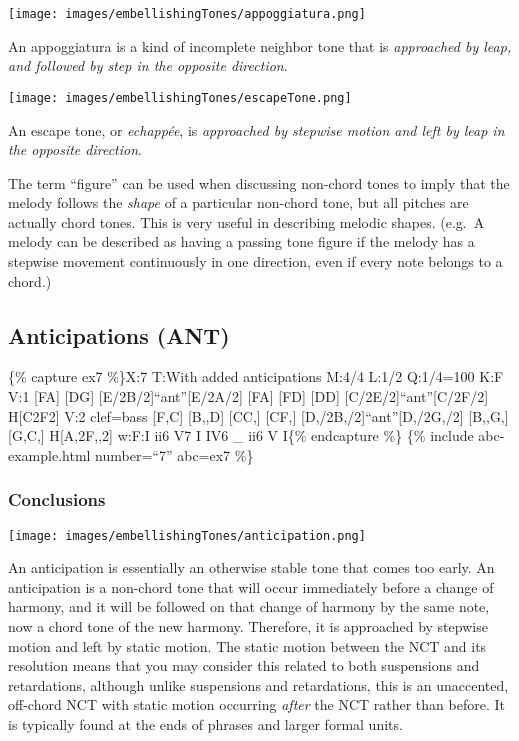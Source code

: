 \documentclass{book}
\begin{document}
\texttt{[image: images/embellishingTones/appoggiatura.png]}

An appoggiatura is a kind of incomplete neighbor tone that is \emph{approached
by leap, and followed by step in the opposite direction}.

\texttt{[image: images/embellishingTones/escapeTone.png]}

An escape tone, or \emph{echappée}, is \emph{approached by stepwise motion and
left by leap in the opposite direction}.

The term ``figure'' can be used when discussing non-chord tones to imply that
the melody follows the \emph{shape} of a particular non-chord tone, but all
pitches are actually chord tones. This is very useful in describing melodic
shapes. (e.g.~A melody can be described as having a passing tone figure if the
melody has a stepwise movement continuously in one direction, even if every
note belongs to a chord.)

\hypertarget{anticipations-ant}{%
\subsection{Anticipations (ANT)}\label{anticipations-ant}}

\{\% capture ex7 \%\}X:7 T:With added anticipations M:4/4 L:1/2 Q:1/4=100 K:F
V:1 {[}FA{]}\textbar{} {[}DG{]} {[}E/2B/2{]}``ant''{[}E/2A/2{]}\textbar{}
{[}FA{]} {[}FD{]}\textbar{} {[}DD{]} {[}C/2E/2{]}``ant''{[}C/2F/2{]}\textbar{}
H{[}C2F2{]}\textbar{]} V:2 clef=bass {[}F,C{]}\textbar{} {[}B,,D{]}
{[}CC,{]}\textbar{} {[}CF,{]} {[}D,/2B,/2{]}``ant''{[}D,/2G,/2{]}\textbar{}
{[}B,,G,{]} {[}G,C,{]}\textbar{} H{[}A,2F,,2{]}\textbar{]} w:F:I ii6 V7 I IV6
\_ ii6 V I\{\% endcapture \%\} \{\% include abc-example.html number=``7''
abc=ex7 \%\}

\hypertarget{conclusions-41}{%
\subsubsection{Conclusions}\label{conclusions-41}}

\texttt{[image: images/embellishingTones/anticipation.png]}

An anticipation is essentially an otherwise stable tone that comes too early.
An anticipation is a non-chord tone that will occur immediately before a
change of harmony, and it will be followed on that change of harmony by the
same note, now a chord tone of the new harmony. Therefore, it is approached by
stepwise motion and left by static motion. The static motion between the NCT
and its resolution means that you may consider this related to both
suspensions and retardations, although unlike suspensions and retardations,
this is an unaccented, off-chord NCT with static motion occurring \emph{after}
the NCT rather than before. It is typically found at the ends of phrases and
larger formal units.
\end{document}
